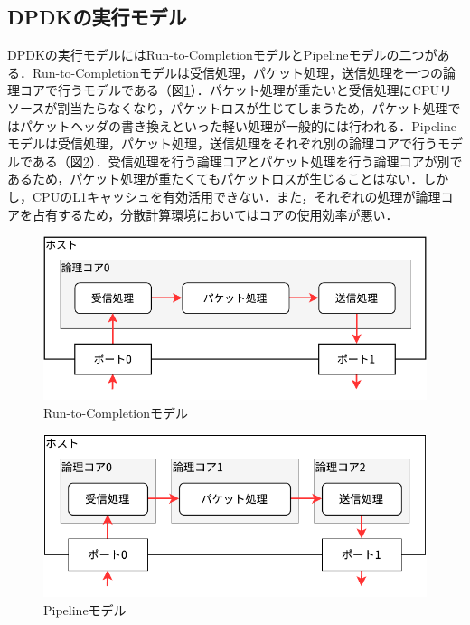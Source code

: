 \subsection{DPDKの実行モデル}
DPDKの実行モデルにはRun-to-CompletionモデルとPipelineモデルの二つがある．Run-to-Completionモデルは受信処理，パケット処理，送信処理を一つの論理コアで行うモデルである（図\ref{fig:RunToCompletion}）．パケット処理が重たいと受信処理にCPUリソースが割当たらなくなり，パケットロスが生じてしまうため，パケット処理ではパケットヘッダの書き換えといった軽い処理が一般的には行われる．Pipelineモデルは受信処理，パケット処理，送信処理をそれぞれ別の論理コアで行うモデルである（図\ref{fig:Pipeline}）．受信処理を行う論理コアとパケット処理を行う論理コアが別であるため，パケット処理が重たくてもパケットロスが生じることはない．しかし，CPUのL1キャッシュを有効活用できない．また，それぞれの処理が論理コアを占有するため，分散計算環境においてはコアの使用効率が悪い．

\begin{figure}[htb]
  \centering
  \includegraphics[width=\columnwidth]{pictures/RunToCompletion.pdf}
  \caption{Run-to-Completionモデル}
  \label{fig:RunToCompletion}
\end{figure}

\begin{figure}[htb]
  \centering
  \includegraphics[width=\columnwidth]{pictures/Pipeline.pdf}
  \caption{Pipelineモデル}
  \label{fig:Pipeline}
\end{figure}

